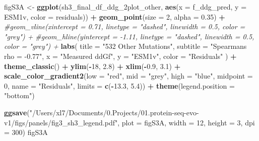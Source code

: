 \documentclass[
]{article}
\newenvironment{Shaded}{\begin{snugshade}}{\end{snugshade}}
\newcommand{\AttributeTok}[1]{\textcolor[rgb]{0.13,0.29,0.53}{#1}}
\newcommand{\CommentTok}[1]{\textcolor[rgb]{0.56,0.35,0.01}{\textit{#1}}}
\newcommand{\DecValTok}[1]{\textcolor[rgb]{0.00,0.00,0.81}{#1}}
\newcommand{\FloatTok}[1]{\textcolor[rgb]{0.00,0.00,0.81}{#1}}
\newcommand{\FunctionTok}[1]{\textcolor[rgb]{0.13,0.29,0.53}{\textbf{#1}}}
\newcommand{\NormalTok}[1]{#1}
\newcommand{\OtherTok}[1]{\textcolor[rgb]{0.56,0.35,0.01}{#1}}
\newcommand{\SpecialCharTok}[1]{\textcolor[rgb]{0.81,0.36,0.00}{\textbf{#1}}}
\newcommand{\StringTok}[1]{\textcolor[rgb]{0.31,0.60,0.02}{#1}}
\begin{document}
\begin{Shaded}
\begin{Highlighting}[]
\NormalTok{figS3A }\OtherTok{\textless{}{-}} \FunctionTok{ggplot}\NormalTok{(sh3\_final\_df\_ddg\_2plot\_other, }\FunctionTok{aes}\NormalTok{(}\AttributeTok{x =}\NormalTok{ f\_ddg\_pred, }\AttributeTok{y =}\NormalTok{ ESM1v, }\AttributeTok{color =}\NormalTok{ residuals)) }\SpecialCharTok{+}
  \FunctionTok{geom\_point}\NormalTok{(}\AttributeTok{size =} \DecValTok{2}\NormalTok{, }\AttributeTok{alpha =} \FloatTok{0.35}\NormalTok{) }\SpecialCharTok{+}
  \CommentTok{\#geom\_vline(xintercept = 0.71, linetype = "dashed", linewidth = 0.5, color = "grey") +}
  \CommentTok{\#geom\_hline(yintercept = {-}1.11, linetype = "dashed", linewidth = 0.5, color = "grey") +}
  \FunctionTok{labs}\NormalTok{(}
    \AttributeTok{title =} \StringTok{"532 Other Mutations"}\NormalTok{,}
    \AttributeTok{subtitle =} \StringTok{"Spearman\textquotesingle{}s rho = {-}0.77"}\NormalTok{,}
    \AttributeTok{x =} \StringTok{"Measured ddGf"}\NormalTok{,}
    \AttributeTok{y =} \StringTok{"ESM1v"}\NormalTok{,}
    \AttributeTok{color =} \StringTok{"Residuals"}
\NormalTok{  ) }\SpecialCharTok{+}
  \FunctionTok{theme\_classic}\NormalTok{() }\SpecialCharTok{+}
  \FunctionTok{ylim}\NormalTok{(}\SpecialCharTok{{-}}\DecValTok{18}\NormalTok{, }\FloatTok{2.8}\NormalTok{) }\SpecialCharTok{+} \FunctionTok{xlim}\NormalTok{(}\SpecialCharTok{{-}}\FloatTok{0.9}\NormalTok{, }\FloatTok{3.1}\NormalTok{) }\SpecialCharTok{+}
  \FunctionTok{scale\_color\_gradient2}\NormalTok{(}\AttributeTok{low =} \StringTok{"red"}\NormalTok{, }\AttributeTok{mid =} \StringTok{"grey"}\NormalTok{, }\AttributeTok{high =} \StringTok{"blue"}\NormalTok{, }\AttributeTok{midpoint =} \DecValTok{0}\NormalTok{, }\AttributeTok{name =} \StringTok{"Residuals"}\NormalTok{,}
                         \AttributeTok{limits =} \FunctionTok{c}\NormalTok{(}\SpecialCharTok{{-}}\FloatTok{13.3}\NormalTok{, }\FloatTok{5.4}\NormalTok{)) }\SpecialCharTok{+}
  \FunctionTok{theme}\NormalTok{(}\AttributeTok{legend.position =} \StringTok{"bottom"}\NormalTok{)}

\FunctionTok{ggsave}\NormalTok{(}\StringTok{"/Users/xl7/Documents/0.Projects/01.protein{-}seq{-}evo{-}v1/figs/panels/fig3\_sh3\_legend.pdf"}\NormalTok{, }
       \AttributeTok{plot =}\NormalTok{ figS3A, }\AttributeTok{width =} \DecValTok{12}\NormalTok{, }\AttributeTok{height =} \DecValTok{3}\NormalTok{, }\AttributeTok{dpi =} \DecValTok{300}\NormalTok{)}
\NormalTok{figS3A}
\end{Highlighting}
\end{Shaded}
\end{document}
